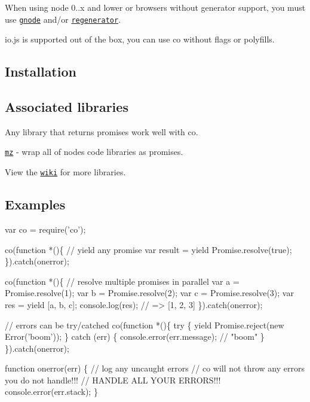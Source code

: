 When using node 0..\+x and lower or browsers without generator support, you must use \href{https://github.com/TooTallNate/gnode}{\tt gnode} and/or \href{http://facebook.github.io/regenerator/}{\tt regenerator}.

io.\+js is supported out of the box, you can use {\ttfamily co} without flags or polyfills.

\subsection*{Installation}




\subsection*{Associated libraries}

Any library that returns promises work well with {\ttfamily co}.


\begin{DoxyItemize}
\item \href{https://github.com/normalize/mz}{\tt mz} -\/ wrap all of node\textquotesingle{}s code libraries as promises.
\end{DoxyItemize}

View the \href{https://github.com/visionmedia/co/wiki}{\tt wiki} for more libraries.

\subsection*{Examples}


\begin{DoxyCode}
var co = require('co');

co(function *()\{
  // yield any promise
  var result = yield Promise.resolve(true);
\}).catch(onerror);

co(function *()\{
  // resolve multiple promises in parallel
  var a = Promise.resolve(1);
  var b = Promise.resolve(2);
  var c = Promise.resolve(3);
  var res = yield [a, b, c];
  console.log(res);
  // => [1, 2, 3]
\}).catch(onerror);

// errors can be try/catched
co(function *()\{
  try \{
    yield Promise.reject(new Error('boom'));
  \} catch (err) \{
    console.error(err.message); // "boom"
 \}
\}).catch(onerror);

function onerror(err) \{
  // log any uncaught errors
  // co will not throw any errors you do not handle!!!
  // HANDLE ALL YOUR ERRORS!!!
  console.error(err.stack);
\}
\end{DoxyCode}


